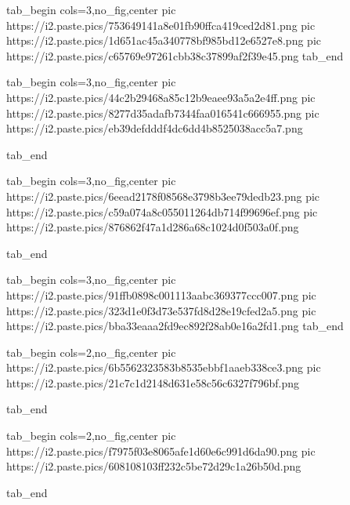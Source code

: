  
 
 
 
 
\zzSecCmtScr

\ifcmt
  tab_begin cols=3,no_fig,center
	     pic https://i2.paste.pics/753649141a8e01fb90ffca419ced2d81.png
	     pic https://i2.paste.pics/1d651ac45a340778bf985bd12e6527e8.png
	     pic https://i2.paste.pics/c65769e97261cbb38c37899af2f39e45.png
  tab_end
\fi

\ifcmt
  tab_begin cols=3,no_fig,center
		pic https://i2.paste.pics/44c2b29468a85c12b9eaee93a5a2e4ff.png
		pic https://i2.paste.pics/8277d35adafb7344faa016541c666955.png
		pic https://i2.paste.pics/eb39defdddf4dc6dd4b8525038acc5a7.png

  tab_end
\fi

\ifcmt
  tab_begin cols=3,no_fig,center
		pic https://i2.paste.pics/6eead2178f08568e3798b3ee79dedb23.png
		pic https://i2.paste.pics/c59a074a8c055011264db714f99696ef.png
		pic https://i2.paste.pics/876862f47a1d286a68c1024d0f503a0f.png

  tab_end
\fi

\ifcmt
  tab_begin cols=3,no_fig,center
		pic https://i2.paste.pics/91ffb0898c001113aabc369377ccc007.png
		pic https://i2.paste.pics/323d1e0f3d73e537fd8d28e19cfed2a5.png
		pic https://i2.paste.pics/bba33eaaa2fd9ec892f28ab0e16a2fd1.png
  tab_end
\fi

\ifcmt
  tab_begin cols=2,no_fig,center
	pic https://i2.paste.pics/6b5562323583b8535ebbf1aaeb338ce3.png
	pic https://i2.paste.pics/21c7c1d2148d631e58c56c6327f796bf.png

  tab_end
\fi

\ifcmt
  tab_begin cols=2,no_fig,center
	pic https://i2.paste.pics/f7975f03e8065afe1d60e6c991d6da90.png
	pic https://i2.paste.pics/608108103ff232c5be72d29c1a26b50d.png

  tab_end
\fi
